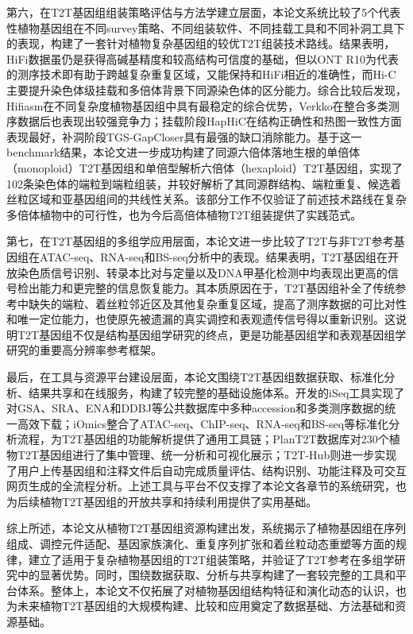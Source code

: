 第六，在T2T基因组组装策略评估与方法学建立层面，本论文系统比较了5个代表性植物基因组在不同survey策略、不同组装软件、不同挂载工具和不同补洞工具下的表现，构建了一套针对植物复杂基因组的较优T2T组装技术路线。结果表明，HiFi数据虽仍是获得高碱基精度和较高结构可信度的基础，但以ONT R10为代表的测序技术即有助于跨越复杂重复区域，又能保持和HiFi相近的准确性，而Hi-C主要提升染色体级挂载和多倍体背景下同源染色体的区分能力。综合比较后发现，Hifiasm在不同复杂度植物基因组中具有最稳定的综合优势，Verkko在整合多类测序数据后也表现出较强竞争力；挂载阶段HapHiC在结构正确性和热图一致性方面表现最好，补洞阶段TGS-GapCloser具有最强的缺口消除能力。基于这一benchmark结果，本论文进一步成功构建了同源六倍体落地生根的单倍体（monoploid）T2T基因组和单倍型解析六倍体（hexaploid）T2T基因组，实现了102条染色体的端粒到端粒组装，并较好解析了其同源群结构、端粒重复、候选着丝粒区域和亚基因组间的共线性关系。该部分工作不仅验证了前述技术路线在复杂多倍体植物中的可行性，也为今后高倍体植物T2T组装提供了实践范式。

第七，在T2T基因组的多组学应用层面，本论文进一步比较了T2T与非T2T参考基因组在ATAC-seq、RNA-seq和BS-seq分析中的表现。结果表明，T2T基因组在开放染色质信号识别、转录本比对与定量以及DNA甲基化检测中均表现出更高的信号检出能力和更完整的信息恢复能力。其本质原因在于，T2T基因组补全了传统参考中缺失的端粒、着丝粒邻近区及其他复杂重复区域，提高了测序数据的可比对性和唯一定位能力，也使原先被遗漏的真实调控和表观遗传信号得以重新识别。这说明T2T基因组不仅是结构基因组学研究的终点，更是功能基因组学和表观基因组学研究的重要高分辨率参考框架。

最后，在工具与资源平台建设层面，本论文围绕T2T基因组数据获取、标准化分析、结果共享和在线服务，构建了较完整的基础设施体系。开发的iSeq工具实现了对GSA、SRA、ENA和DDBJ等公共数据库中多种accession和多类测序数据的统一高效下载；iOmics整合了ATAC-seq、ChIP-seq、RNA-seq和BS-seq等标准化分析流程，为T2T基因组的功能解析提供了通用工具链；PlanT2T数据库对230个植物T2T基因组进行了集中管理、统一分析和可视化展示；T2T-Hub则进一步实现了用户上传基因组和注释文件后自动完成质量评估、结构识别、功能注释及可交互网页生成的全流程分析。上述工具与平台不仅支撑了本论文各章节的系统研究，也为后续植物T2T基因组的开放共享和持续利用提供了实用基础。

综上所述，本论文从植物T2T基因组资源构建出发，系统揭示了植物基因组在序列组成、调控元件适配、基因家族演化、重复序列扩张和着丝粒动态重塑等方面的规律，建立了适用于复杂植物基因组的T2T组装策略，并验证了T2T参考在多组学研究中的显著优势。同时，围绕数据获取、分析与共享构建了一套较完整的工具和平台体系。整体上，本论文不仅拓展了对植物基因组结构特征和演化动态的认识，也为未来植物T2T基因组的大规模构建、比较和应用奠定了数据基础、方法基础和资源基础。

